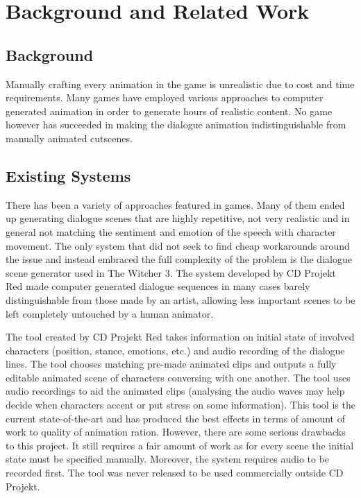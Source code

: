 \chapter{Background and Related Work \label{chap:background}}

\section{Background}
Manually crafting every animation in the game is unrealistic due to cost and time requirements. Many games have employed various approaches to computer generated animation in order to generate hours of realistic content. No game however has succeeded in making the dialogue animation indistinguishable from manually animated cutscenes.

\section{Existing Systems}

There has been a variety of approaches featured in games. Many of them ended up generating dialogue scenes that are highly repetitive, not very realistic and in general not matching the sentiment and emotion of the speech with character movement. The only system that did not seek to find cheap workarounds around the issue and instead embraced the full complexity of the problem is the dialogue scene generator used in The Witcher 3. The system developed by CD Projekt Red made computer generated dialogue sequences in many cases barely distinguishable from those made by an artist, allowing less important scenes to be left completely untouched by a human animator. ~\cite{pcgamerwitcher}


The tool created by CD Projekt Red takes information on initial state of involved characters (position, stance, emotions, etc.) and audio recording of the dialogue lines. The tool chooses matching pre-made animated clips and outputs a fully editable animated scene of characters conversing with one another. The tool uses audio recordings to aid the animated clips (analysing the audio waves may help decide when characters accent or put stress on some information). This tool is the current state-of-the-art and has produced the best effects in terms of amount of work to quality of animation ration. However, there are some serious drawbacks to this project. It still requires a fair amount of work as for every scene the initial state must be specified manually. Moreover, the system requires audio to be recorded first. The tool was never released to be used commercially outside CD Projekt. ~\cite{gdcwitcher}


